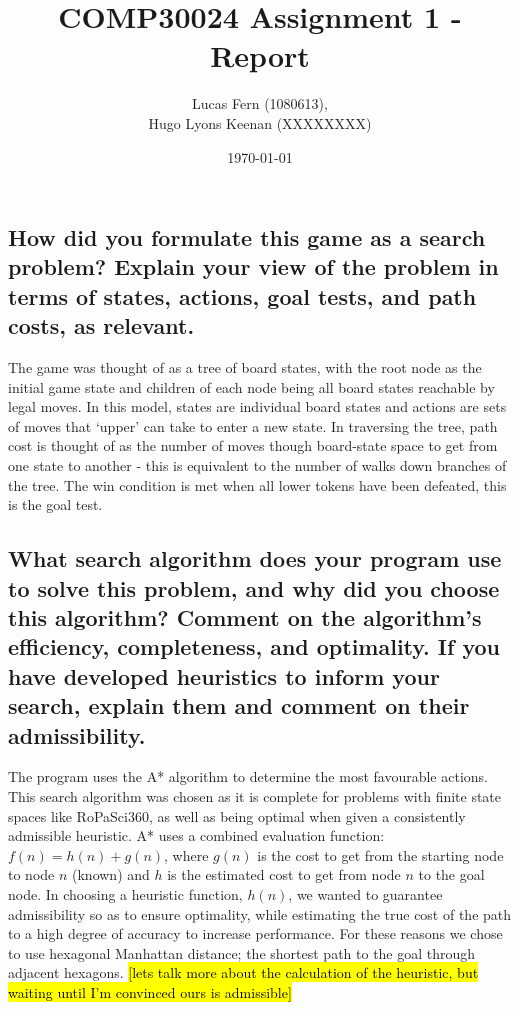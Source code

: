 \documentclass{article}
\title{COMP30024 Assignment 1 - Report}
\date{\today}
\author{Lucas Fern (1080613),\\Hugo Lyons Keenan (XXXXXXXX)}
\begin{document}
\maketitle
\subsection*{How did you formulate this game as a search problem? Explain your view of the problem in terms of states, actions, goal tests, and path costs, as relevant.}
The game was thought of as a tree of board states, with the root node as the initial game state and children of each node being all board states reachable by legal moves. In this model, states are individual board states and actions are sets of moves that ‘upper’ can take to enter a new state. In traversing the tree, path cost is thought of as the number of moves though board-state space to get from one state to another - this is equivalent to the number of walks down branches of the tree. The win condition is met when all lower tokens have been defeated, this is the goal test.

\subsection*{What search algorithm does your program use to solve this problem, and why did you choose this algorithm? Comment on the algorithm’s efficiency, completeness, and optimality. If you have developed heuristics to inform your search, explain them and comment on their admissibility.}
The program uses the A* algorithm to determine the most favourable actions. This search algorithm was chosen as it is complete for problems with finite state spaces like RoPaSci360, as well as being optimal when given a consistently admissible heuristic. A* uses a combined evaluation function: \(f(n) = h(n) + g(n)\), where \(g(n)\) is the cost to get from the starting node to node $n$ (known) and $h$ is the estimated cost to get from node $n$ to the goal node. In choosing a heuristic function, $h(n)$, we wanted to guarantee admissibility so as to ensure optimality, while estimating the true cost of the path to a high degree of accuracy to increase performance. For these reasons we chose to use hexagonal Manhattan distance; the shortest path to the goal through adjacent hexagons. \hl{[lets talk more about the calculation of the heuristic, but waiting until I'm convinced ours is admissible]}
\end{document}
